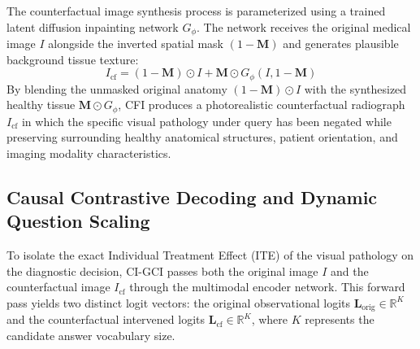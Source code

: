 \documentclass[journal]{IEEEtran}
\begin{document}
The counterfactual image synthesis process is parameterized using a trained latent diffusion inpainting network $G_{\phi}$. The network receives the original medical image $I$ alongside the inverted spatial mask $(1 - \mathbf{M})$ and generates plausible background tissue texture:
\begin{equation}
I_{\text{cf}} = (1 - \mathbf{M}) \odot I + \mathbf{M} \odot G_{\phi}(I, 1 - \mathbf{M})
\end{equation}
By blending the unmasked original anatomy $(1 - \mathbf{M}) \odot I$ with the synthesized healthy tissue $\mathbf{M} \odot G_{\phi}$, CFI produces a photorealistic counterfactual radiograph $I_{\text{cf}}$ in which the specific visual pathology under query has been negated while preserving surrounding healthy anatomical structures, patient orientation, and imaging modality characteristics.

\subsection{Causal Contrastive Decoding and Dynamic Question Scaling}
To isolate the exact Individual Treatment Effect (ITE) of the visual pathology on the diagnostic decision, CI-GCI passes both the original image $I$ and the counterfactual image $I_{\text{cf}}$ through the multimodal encoder network. This forward pass yields two distinct logit vectors: the original observational logits $\mathbf{L}_{\text{orig}} \in \mathbb{R}^{K}$ and the counterfactual intervened logits $\mathbf{L}_{\text{cf}} \in \mathbb{R}^{K}$, where $K$ represents the candidate answer vocabulary size.
\end{document}
